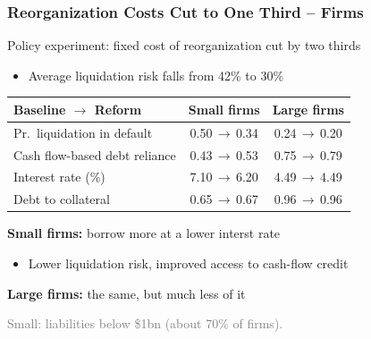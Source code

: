 \documentclass[aspectratio=169,xcolor=table]{beamer}
\begin{document}
\begin{frame}[label=effects] \frametitle{Reorganization Costs Cut to One Third -- Firms \hfill \hyperlink{reformsize}{}}

Policy experiment: fixed cost of reorganization cut by two thirds
\begin{itemize} \small
    \item Average liquidation risk falls from 42\% to 30\%
\end{itemize} \normalsize
\vspace{1mm}

\footnotesize
\begin{table}[h!]
\centering
\renewcommand{\arraystretch}{1.05}
\begin{tabular}{lcc}
\toprule
Baseline $\to$ \textcolor{primary}{Reform} & \textbf{Small firms} & \textbf{Large firms} \\
\midrule
Pr.\ liquidation in default    & 0.50\,$\to$\,\textcolor{primary}{0.34} & 0.24\,$\to$\,\textcolor{primary}{0.20} \\
Cash flow-based debt reliance  & 0.43\,$\to$\,\textcolor{primary}{0.53} & 0.75\,$\to$\,\textcolor{primary}{0.79} \\
Interest rate (\%)             & 7.10\,$\to$\,\textcolor{primary}{6.20} & 4.49\,$\to$\,\textcolor{primary}{4.49} \\
Debt to collateral             & 0.65\,$\to$\,\textcolor{primary}{0.67} & 0.96\,$\to$\,\textcolor{primary}{0.96} \\
\bottomrule
\end{tabular}
\end{table}
\normalsize

\textbf{Small firms:} borrow more at a lower interst rate
\begin{itemize} \small
    \item  Lower liquidation risk, improved access to cash-flow credit
\end{itemize} \normalsize \vspace{1mm}

\textbf{Large firms:} the same, but much less of it

\vfil

{\scriptsize\textcolor{gray}{Small: liabilities below \$1bn (about 70\% of firms). }}

\end{frame}
\end{document}
